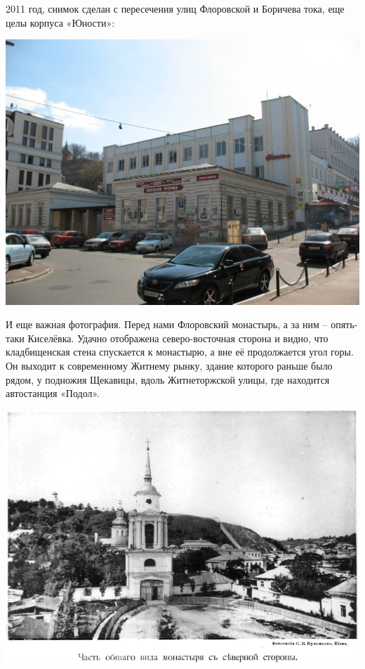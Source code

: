 2011 год, снимок сделан с пересечения улиц Флоровской и Боричева тока, еще целы корпуса «Юности»:

\begin{center}
\includegraphics[width=\linewidth]{chast-colebanie-osnov/gora-zamkovaya-valovaya/s_IMG_1490.JPG}
\end{center}

И еще важная фотография. Перед нами Флоровский монастырь, а за ним – опять-таки Киселёвка. Удачно отображена северо-восточная сторона и видно, что кладбищенская стена спускается к монастырю, а вне её продолжается угол горы. Он выходит к современному Житнему рынку, здание которого раньше было рядом, у подножия Щекавицы, вдоль Житнеторжской улицы, где находится автостанция «Подол».

\begin{center}
\includegraphics[width=\linewidth]{chast-colebanie-osnov/gora-zamkovaya-valovaya/flor-1894.png}
\end{center}

